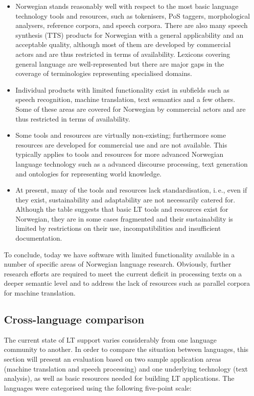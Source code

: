 \begin{multicols}{2}
\begin{itemize}
\item Norwegian stands reasonably well with respect to the most basic language technology tools and resources, such as tokenisers, PoS taggers, morphological analysers, reference corpora, and speech corpora. 
There are also many speech synthesis (TTS) products for Norwegian with a general applicability and an acceptable quality, although most of them are developed by commercial actors and are thus restricted in terms of availability. Lexicons covering general language are well-represented but there are major gaps in the coverage of terminologies representing specialised domains.
\item Individual products with limited functionality exist in subfields such as speech recognition, machine translation, text semantics and a few others. 
Some of these areas are covered for Norwegian by commercial actors and are thus restricted in terms of availability.
\item Some tools and resources are virtually non-existing; furthermore some resources are developed for commercial use and are not available. 
This typically applies to tools and resources for more advanced Norwegian language technology such as a advanced discourse processing, text generation and ontologies for representing world knowledge.
\item At present, many of the tools and resources lack standardisation, i.\,e., even if they exist, sustainability and adaptability are not necessarily catered for. 
Although the table suggests that basic LT tools and resources exist for Norwegian, they are in some cases fragmented and their sustainability is limited by restrictions on their use, incompatibilities and insufficient documentation. 
\end{itemize}

To conclude, today we have software with limited functionality available in a number of specific areas of Norwegian language research. 
Obviously, further research efforts are required to meet the current deficit in processing texts on a deeper semantic level and to address the lack of resources such as parallel corpora for machine translation.

\subsection{Cross-language comparison}


The current state of LT support varies considerably from one language community to another. In order to compare the situation between languages, this section will present an evaluation based on two sample application areas (machine translation and speech processing) and one underlying technology (text analysis), as well as basic resources needed for building LT applications. The languages were categorised using the following five-point scale: 


\end{multicols}
